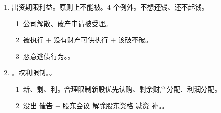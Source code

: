 \begin{enumerate}
\begin{enumerate}
\begin{enumerate}
\begin{enumerate}
                          \item {}。。非股东原因导致股票/债权价值下跌的不算出资不实。
                          \item {}。 \yjt 实质损害。
                                \begin{itemize}
                                  \item {}，。
                                  \item 超出部分认定为侵害公司的财产权进行处理。
                                \end{itemize}
                        \end{enumerate}
                  \item 对外。债权人。
                        \begin{enumerate}
                          \item 行使代位权。
                          \item {}、高管（增资时）。
                                。
                        \end{enumerate}
                \end{enumerate}
          \item 出资期限利益。原则上不能被。4 个例外。不想还钱、还不起钱。
                \begin{enumerate}
                  \item 公司解散、破产申请被受理。
                  \item 被执行 + 没有财产可供执行 + 该破不破。
                  \item 恶意逃债行为。。
                \end{enumerate}
          \item {}。权利限制。。
                \begin{enumerate}
                  \item 新、剩、利。合理限制新股优先认购、剩余财产分配、利润分配。
                  \item 没出 \yjt 催告 + 股东会议 \yjt 解除股东资格 \yjt 减资 \hz 补。。
                \end{enumerate}
        \end{enumerate}
\end{enumerate}
